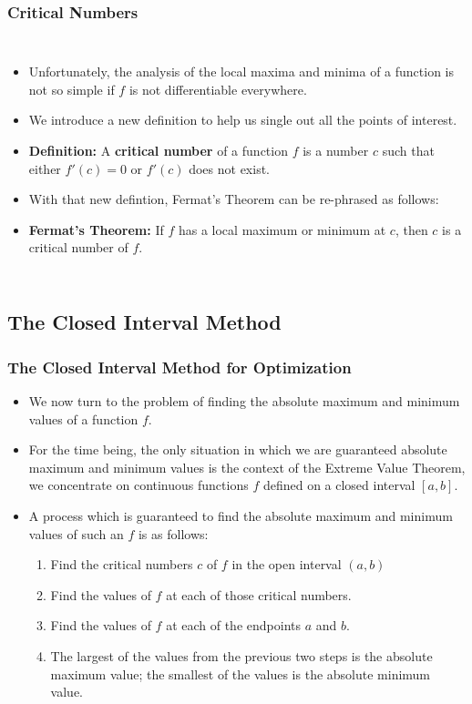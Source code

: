 \documentclass[serif,ignorenonframetext]{beamer}
\begin{document}
\begin{frame}
  \frametitle{Critical Numbers}
  \begin{columns}
  \begin{itemize}[<+->]
  \item Unfortunately, the analysis of the local maxima and minima of
    a function is not so simple if $f$ is not differentiable everywhere.
  \item We introduce a new definition to help us single out all the points
    of interest.
  \item \textbf{Definition:} A \textbf{critical number} of a function $f$
    is a number $c$ such that either $f'(c)=0$ or $f'(c)$ does not exist.
  \item With that new defintion, Fermat's Theorem can be re-phrased as
    follows:
  \item \textbf{Fermat's Theorem:} If $f$ has a local maximum or minimum
    at $c$, then $c$ is a critical number of $f$.
  \end{itemize}
  \end{columns}
\end{frame}


\subsection{The Closed Interval Method}

\begin{frame}
  \frametitle{The Closed Interval Method for Optimization}
  \begin{itemize}[<+->]
  \item We now turn to the problem of finding the absolute maximum and
    minimum values of a function $f$.
  \item For the time being,
    the only situation in which we are guaranteed absolute maximum and
    minimum values is the context of the Extreme Value Theorem,
    we concentrate on continuous functions $f$ defined on a closed interval
    $[a,b]$.
  \item A process which is guaranteed to find the absolute maximum and
    minimum values of such an $f$ is as follows:
    \begin{enumerate}
    \item Find the critical numbers $c$ of $f$ in the open interval $(a,b)$
    \item Find the values of $f$ at each of those critical numbers.
    \item Find the values of $f$ at each of the endpoints $a$ and $b$.
    \item The largest of the values from the previous two steps is the
      absolute maximum value; the smallest of the values is the absolute
      minimum value.
    \end{enumerate}
  \end{itemize}
\end{frame}
\end{document}
